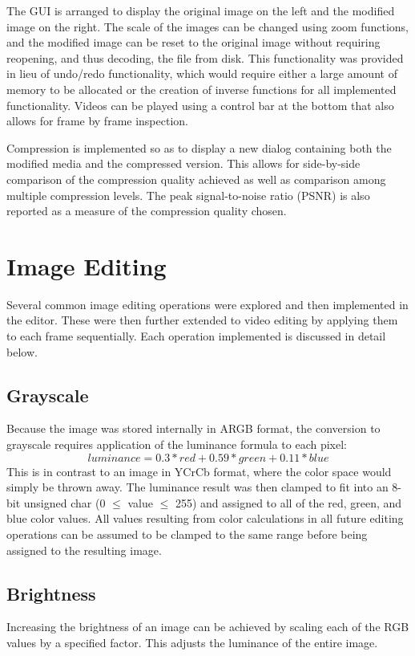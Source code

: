 \documentclass[10pt,twocolumn,twoside]{IEEEtran}
\begin{document}
The GUI is arranged to display the original image on the left and the modified image on the right. The scale of the images can be changed using zoom functions, and the modified image can be reset to the original image without requiring reopening, and thus decoding, the file from disk. This functionality was provided in lieu of undo/redo functionality, which would require either a large amount of memory to be allocated or the creation of inverse functions for all implemented functionality. Videos can be played using a control bar at the bottom that also allows for frame by frame inspection.

Compression is implemented so as to display a new dialog containing both the modified media and the compressed version. This allows for side-by-side comparison of the compression quality achieved as well as comparison among multiple compression levels. The peak signal-to-noise ratio (PSNR) is also reported as a measure of the compression quality chosen. 

\section{Image Editing}
Several common image editing operations were explored and then implemented in the editor. These were then further extended to video editing by applying them to each frame sequentially. Each operation implemented is discussed in detail below.

\subsection{Grayscale}
Because the image was stored internally in ARGB format, the conversion to grayscale requires application of the luminance formula to each pixel: \begin{equation*}luminance = 0.3*red + 0.59*green + 0.11*blue \end{equation*}
This is in contrast to an image in YCrCb format, where the color space would simply be thrown away. The luminance result was then clamped to fit into an 8-bit unsigned char (0 $\leq$ value $\leq$ 255) and assigned to all of the red, green, and blue color values. All values resulting from color calculations in all future editing operations can be assumed to be clamped to the same range before being assigned to the resulting image. 

\subsection{Brightness}
Increasing the brightness of an image can be achieved by scaling each of the RGB values by a specified factor. This adjusts the luminance of the entire image.
\end{document}
